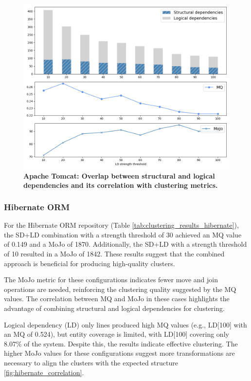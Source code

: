 \documentclass{ieeeaccess}
\begin{document}
\begin{figure}[t!]
  \centering
  \includegraphics[width=\columnwidth]{catalina_correlation.png}
  \caption{\textbf{Apache Tomcat: Overlap between structural and logical dependencies and its correlation with clustering metrics.}}
  \label{fig:catalina_correlation}
\end{figure}

\subsubsection{Hibernate ORM}

For the Hibernate ORM repository (Table \ref{tab:clustering_results_hibernate}), the SD+LD combination with a strength threshold of 30 achieved an MQ value of 0.149 and a MoJo of 1870. Additionally, the SD+LD with a strength threshold of 10 resulted in a MoJo of 1842. These results suggest that the combined approach is beneficial for producing high-quality clusters.

The MoJo metric for these configurations indicates fewer move and join operations are needed, reinforcing the clustering quality suggested by the MQ values. The correlation between MQ and MoJo in these cases highlights the advantage of combining structural and logical dependencies for clustering.

Logical dependency (LD) only lines produced high MQ values (e.g., LD[100] with an MQ of 0.524), but entity coverage is limited, with LD[100] covering only 8.07\% of the system. Despite this, the results indicate effective clustering. The higher MoJo values for these configurations suggest more transformations are necessary to align the clusters with the expected structure  \ref{fig:hibernate_correlation}.
\end{document}
